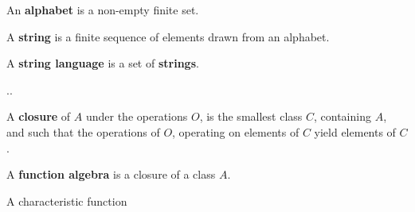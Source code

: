 
\begin{definition}

An \textbf{alphabet} is a non-empty finite set.

\end{definition}

\begin{definition}

A \textbf{string} is a finite sequence of elements drawn from an alphabet.

\end{definition}

\begin{definition}

A \textbf{string language} is a set of \textbf{strings}.

\end{definition}

..

\begin{definition}

A \textbf{closure} of $A$ under the operations $O$, is the smallest class $C$,
containing $A$, and such that the operations of $O$, operating on elements of
$C$ yield elements of $C$.

\end{definition}

\begin{definition}

A \textbf{function algebra} is a closure of a class $A$.

\end{definition}

\begin{definition}

A characteristic function 

\end{definition}
